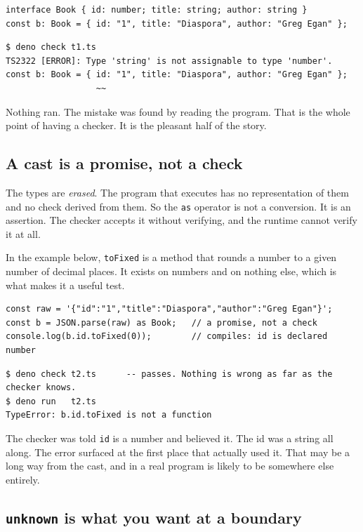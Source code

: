 \documentclass[11pt,a4paper]{article}
\begin{document}
\begin{lstlisting}[language=TS]
interface Book { id: number; title: string; author: string }
const b: Book = { id: "1", title: "Diaspora", author: "Greg Egan" };
\end{lstlisting}

\begin{lstlisting}[language=SH]
$ deno check t1.ts
TS2322 [ERROR]: Type 'string' is not assignable to type 'number'.
const b: Book = { id: "1", title: "Diaspora", author: "Greg Egan" };
                  ~~
\end{lstlisting}

Nothing ran. The mistake was found by reading the program. That is the whole point of having a
checker. It is the pleasant half of the story.

\subsection{A cast is a promise, not a check}

The types are \emph{erased}. The program that executes has no representation of them and no check
derived from them. So the \texttt{as} operator is not a conversion. It is an assertion. The checker
accepts it without verifying, and the runtime cannot verify it at all.

In the example below, \texttt{toFixed} is a method that rounds a number to a given number of
decimal places. It exists on numbers and on nothing else, which is what makes it a useful test.

\begin{lstlisting}[language=TS]
const raw = '{"id":"1","title":"Diaspora","author":"Greg Egan"}';
const b = JSON.parse(raw) as Book;   // a promise, not a check
console.log(b.id.toFixed(0));        // compiles: id is declared number
\end{lstlisting}

\begin{lstlisting}[language=SH]
$ deno check t2.ts      -- passes. Nothing is wrong as far as the checker knows.
$ deno run   t2.ts
TypeError: b.id.toFixed is not a function
\end{lstlisting}

The checker was told \texttt{id} is a number and believed it. The id was a string all along. The
error surfaced at the first place that actually used it. That may be a long way from the cast, and
in a real program is likely to be somewhere else entirely.

\subsection{\texttt{unknown} is what you want at a boundary}
\end{document}
